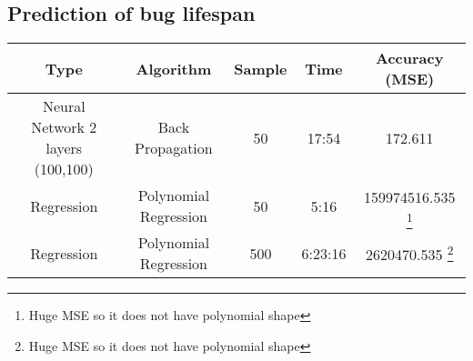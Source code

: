 \subsection{Prediction of bug lifespan} %
\label{sub:Prediction of bug lifespan}
\begin{tabular}{|c|c|c|c|c|}
\hline
Type &Algorithm   &     Sample &  Time &  Accuracy (MSE)\\
\hline
\hline
Neural Network 2 layers (100,100) & Back Propagation  & 50     &  17:54 & 172.611 \\
Regression & Polynomial Regression              & 50     &  5:16  & 159974516.535  \footnote{Huge MSE so it does not have polynomial shape}\\
Regression & Polynomial Regression              & 500    &  6:23:16 & 2620470.535  \footnote{Huge MSE so it does not have polynomial shape}\\
\hline
\end{tabular}
